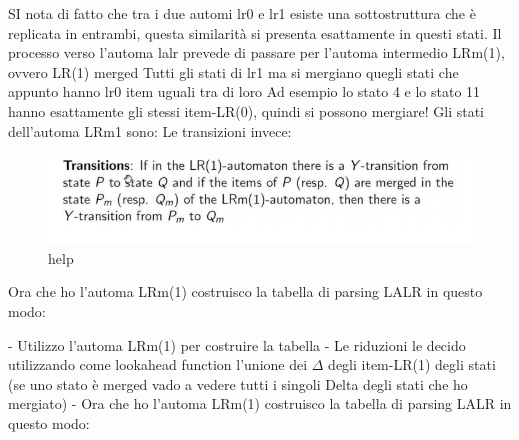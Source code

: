 \documentclass[class=book, crop=false, oneside, 12pt]{standalone}
\begin{document}
SI nota di fatto che tra i due automi lr0 e lr1 esiste una sottostruttura che è replicata in entrambi,
questa similarità si presenta esattamente in questi stati.
Il processo verso l'automa lalr prevede di passare per l'automa intermedio LRm(1), ovvero LR(1)
merged
Tutti gli stati di lr1 ma si mergiano quegli stati che appunto hanno lr0 item uguali tra di loro
Ad esempio lo stato 4 e lo stato 11 hanno esattamente gli stessi item-LR(0), quindi si possono
mergiare!
Gli stati dell'automa LRm1 sono:
Le transizioni invece:
\begin{figure}[H]
    \centering
    \includegraphics[width=.8\textwidth]{send_help_8.png}
    \caption{help}
\end{figure}
Ora che ho l'automa LRm(1) costruisco la tabella di parsing LALR in questo modo:

- Utilizzo l'automa LRm(1) per costruire la tabella
- Le riduzioni le decido utilizzando come lookahead function l'unione dei \(\Delta\) degli item-LR(1)
degli stati (se uno stato è merged vado a vedere tutti i singoli Delta degli stati che ho mergiato) - Ora che ho l'automa LRm(1) costruisco la tabella di parsing LALR in questo modo:
\end{document}
